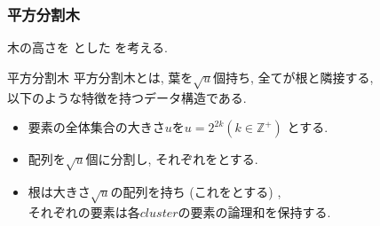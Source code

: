 \documentclass[main]{subfiles}
\begin{document}
\begin{frame}\frametitle{平方分割木}
木の高さを とした を考える.
\begin{block}{平方分割木}
	平方分割木とは, 葉を$\sqrt{u}$個持ち, 全てが根と隣接する, \\以下のような特徴を持つデータ構造である.\\
	\begin{itemize}
	\item 要素の全体集合の大きさ$u$を$u = 2^{2k} (k \in \mathbb{Z}^{+})$ とする.\\
	\item 配列を$\sqrt{u}$個に分割し, それぞれをとする.\\
	\item 根は大きさ$\sqrt{u}$の配列を持ち (これをとする) ,\\ それぞれの要素は各$cluster$の要素の論理和を保持する.
	\end{itemize}
\end{block}


\end{frame}
\end{document}
